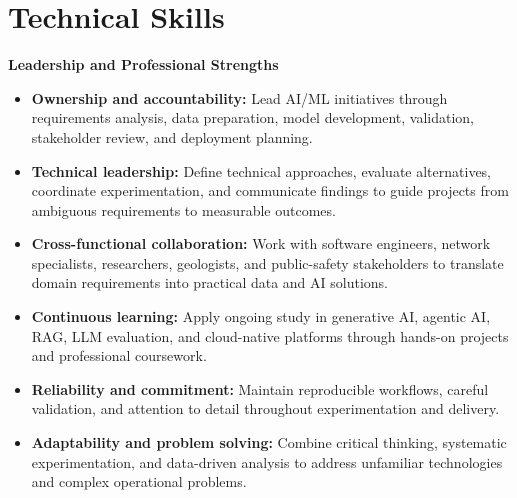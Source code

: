 \documentclass[9pt,letterpaper]{extarticle}
\begin{document}
\section{Technical Skills}
\par
{}\par
{}\par
{}\par
{}\par
{}\par
{}\textbf{Leadership and Professional Strengths}\par
\begin{itemize}
\item \textbf{Ownership and accountability:} Lead AI/ML initiatives through requirements analysis, data preparation, model development, validation, stakeholder review, and deployment planning.
\item \textbf{Technical leadership:} Define technical approaches, evaluate alternatives, coordinate experimentation, and communicate findings to guide projects from ambiguous requirements to measurable outcomes.
\item \textbf{Cross-functional collaboration:} Work with software engineers, network specialists, researchers, geologists, and public-safety stakeholders to translate domain requirements into practical data and AI solutions.
\item \textbf{Continuous learning:} Apply ongoing study in generative AI, agentic AI, RAG, LLM evaluation, and cloud-native platforms through hands-on projects and professional coursework.
\item \textbf{Reliability and commitment:} Maintain reproducible workflows, careful validation, and attention to detail throughout experimentation and delivery.
\item \textbf{Adaptability and problem solving:} Combine critical thinking, systematic experimentation, and data-driven analysis to address unfamiliar technologies and complex operational problems.
\end{itemize}
\end{document}
